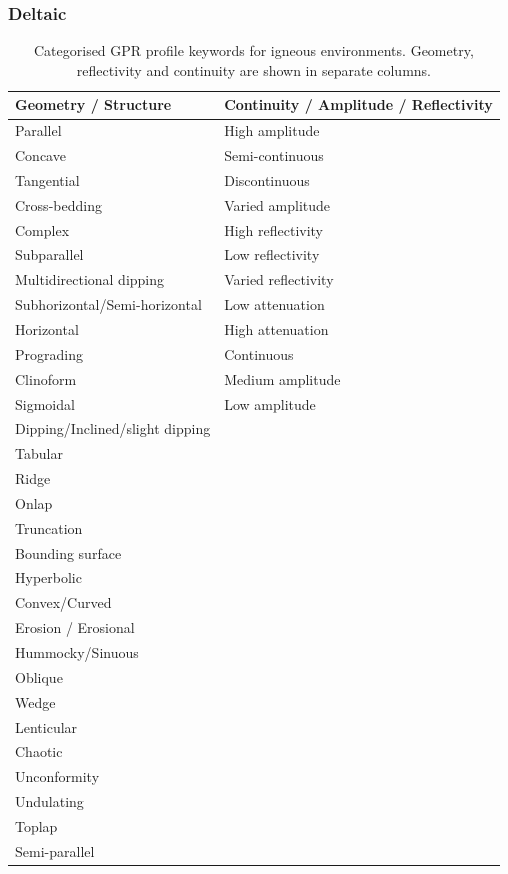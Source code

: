 \clearpage
\subsubsection{Deltaic}
\begin{table}[h!]
\centering
\caption{Categorised GPR profile keywords for igneous environments. Geometry, reflectivity and continuity are shown in separate columns.}
\begin{tabular}{|p{6.5cm}|p{6.5cm}|}
\hline
\textbf{Geometry / Structure} & \textbf{Continuity / Amplitude / Reflectivity} \\
\hline
Parallel & High amplitude \\
Concave & Semi-continuous \\
Tangential & Discontinuous \\
Cross-bedding & Varied amplitude \\
Complex & High reflectivity \\
Subparallel & Low reflectivity \\
Multidirectional dipping & Varied reflectivity \\
Subhorizontal/Semi-horizontal & Low attenuation \\
Horizontal & High attenuation \\
Prograding & Continuous \\
Clinoform & Medium amplitude \\
Sigmoidal & Low amplitude \\
Dipping/Inclined/slight dipping & \\
Tabular & \\
Ridge & \\
Onlap & \\
Truncation & \\
Bounding surface & \\
Hyperbolic & \\
Convex/Curved& \\
Erosion / Erosional & \\
Hummocky/Sinuous & \\
Oblique & \\
Wedge & \\
Lenticular & \\
Chaotic & \\
Unconformity & \\
Undulating & \\
Toplap & \\
Semi-parallel & \\
\hline
\end{tabular}
\label{tab:coastal-keywords}
\end{table}
 
